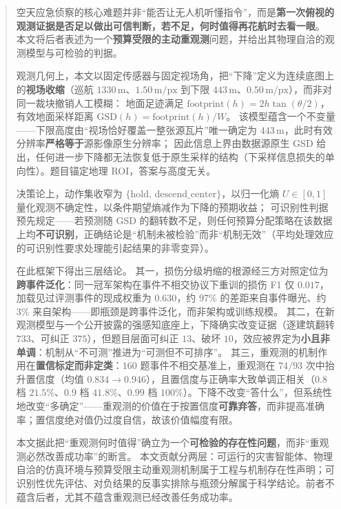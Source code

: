 \begin{abstract}
空天应急侦察的核心难题并非``能否让无人机听懂指令''，而是\textbf{第一次俯视的观测证据是否足以做出可信判断，若不足，何时值得再花航时去看一眼}。
本文将后者表述为一个\textbf{预算受限的主动重观测}问题，并给出其物理自洽的观测模型与可检验的判据。

观测几何上，本文以固定传感器与固定视场角，把``下降''定义为连续底图上的\textbf{视场收缩}（巡航 $1330\,\mathrm{m}$、$1.50\,\mathrm{m/px}$ 到下限 $443\,\mathrm{m}$、$0.50\,\mathrm{m/px}$），而非对同一裁块撤销人工模糊：
地面足迹满足 $\mathrm{footprint}(h)=2h\tan(\theta/2)$，有效地面采样距离 $\mathrm{GSD}(h)=\mathrm{footprint}(h)/W$。
该模型蕴含一个不变量——下限高度由``视场恰好覆盖一整张源瓦片''唯一确定为 $443\,\mathrm{m}$，此时有效分辨率\textbf{严格等于}源影像原生分辨率；
因此信息上界由数据源原生 GSD 给出，任何进一步下降都无法恢复低于原生采样的结构（下采样信息损失的单向性）。题目锚定地理 ROI，答案与高度无关。

决策论上，动作集收窄为 $\{\mathrm{hold},\,\mathrm{descend\_center}\}$，以归一化熵 $U\in[0,1]$ 量化观测不确定性，以条件期望熵减作为下降的预期收益；
可识别性判据预先规定——若预测随 GSD 的翻转数不足，则任何预算分配策略在该数据上均\textbf{不可识别}，正确结论是``机制未被检验''而非``机制无效''（平均处理效应的可识别性要求处理能引起结果的非零变异）。

在此框架下得出三层结论。
其一，损伤分级坍缩的根源经三方对照定位为\textbf{跨事件泛化}：同一冠军架构在事件不相交协议下重训的损伤 F1 仅 $0.017$，加载见过评测事件的现成权重为 $0.630$，约 $97\%$ 的差距来自事件曝光、约 $3\%$ 来自架构——即瓶颈是跨事件泛化，而非架构或训练规模。
其二，在新观测模型与一个公开披露的强感知底座上，下降确实改变证据（逐建筑翻转 $733$、可纠正 $375$），但题目层面可纠正 $13$、破坏 $10$，效应被界定为\textbf{小且非单调}：机制从``不可测''推进为``可测但不可排序''。
其三，重观测的机制作用在\textbf{置信标定而非定类}：$160$ 题事件不相交基准上，重观测在 $74/93$ 次中抬升置信度（均值 $0.834\to0.946$），且置信度与正确率大致单调正相关（$0.8$ 档 $21.5\%$、$0.9$ 档 $41.8\%$、$0.99$ 档 $100\%$）。下降不改变``答什么''，但系统性地改变``多确定''——重观测的价值在于按置信度\textbf{可靠弃答}，而非提高准确率；置信度绝对值仍过度自信，故该价值幅度有限。

本文据此把``重观测何时值得''确立为一个\textbf{可检验的存在性问题}，而非``重观测必然改善成功率''的断言。
本文贡献分两层：可运行的灾害智能体、物理自洽的仿真环境与预算受限主动重观测机制属于工程与机制存在性声明；可识别性优先评估、对负结果的反事实排除与瓶颈分解属于科学结论。前者不蕴含后者，尤其不蕴含重观测已经改善任务成功率。
\end{abstract}
